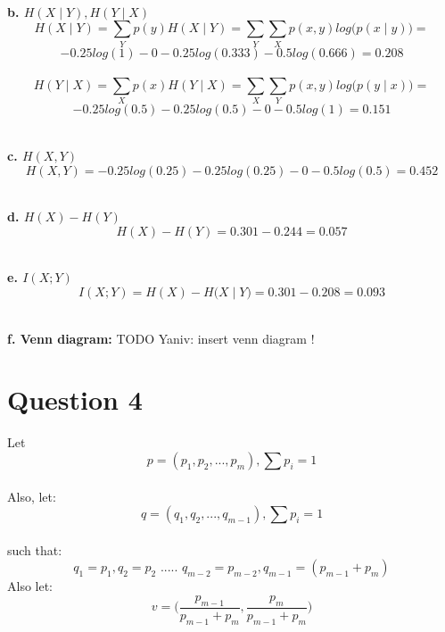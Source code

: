 \documentclass{article}
\begin{document}
    \hfill \\
    \textbf{b. $H(X \mid Y), H(Y \mid X)$}
    \[ H(X \mid Y) =  \sum_Y p(y) H(X \mid Y) = \sum_Y \sum_X p(x, y) log \big(p(x \mid y) \big) = \]
    \[ -0.25 log(1) - 0 - 0.25 log(0.333) - 0.5 log(0.666) = 0.208  \]
    \\
    \[ H(Y \mid X) =  \sum_X p(x) H(Y \mid X) = \sum_X \sum_Y p(x, y) log \big(p(y \mid x) \big) = \]
    \[ -0.25 log(0.5) - 0.25 log(0.5) - 0 - 0.5 log(1) = 0.151 \]
    
    \hfill \\
    \textbf{c. $H(X, Y)$}
    \[ H(X, Y) = -0.25 log(0.25) -0.25 log(0.25) - 0 - 0.5 log(0.5) = 0.452 \]
    
    \hfill \\
    \textbf{d. $H(X) - H(Y)$} 
    \[ H(X) - H(Y) = 0.301 - 0.244 = 0.057 \]

    \hfill \\
    \textbf{e. $I(X;Y)$} 
    \[ I(X;Y) =  H(X) - H \big( X \mid Y\big) = 0.301 - 0.208 = 0.093 \]
    
    \hfill \\
    \textbf{f. Venn diagram:}     
    TODO Yaniv: insert venn diagram !
    
    \break

\section{Question 4}
    Let 
    \[  p = (p_1, p_2, ..., p_m), \sum p_i = 1 \] \\
    Also, let: 
    \[ q = (q_1, q_2, ..., q_{m-1}), \sum p_i = 1 \] \\
    such that:
    \[ q_1=p_1, q_2 =p_2 \text{        .....        } q_{m-2}=p_{m-2}, q_{m-1} = (p_{m-1}+p_m) \]
    Also let:
    \[ v = \Big( \dfrac{p_{m-1}}{p_{m-1} + p_m}, \dfrac{p_{m}}{p_{m-1} + p_m} \Big) \]\\
    
\end{document}
